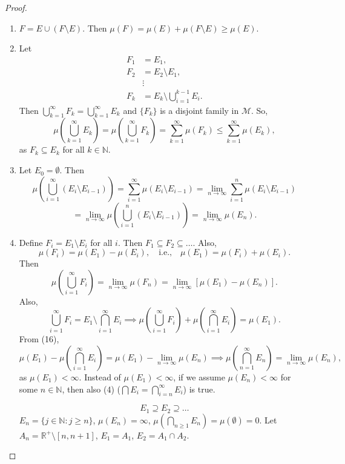 \documentclass{functionspaces}
\begin{document}
\begin{proof}
\begin{enumerate}[label=(\arabic*)]
    \item \( F = E \cup (F \setminus E) \). Then \( \mu(F) = \mu(E) + \mu(F \setminus E) \geq \mu(E) \).
    
    \item Let
    \begin{align*}
    F_1 &= E_1, \\
    F_2 &= E_2 \setminus E_1, \\
    &\vdots \\
    F_k &= E_k \setminus \bigcup_{i=1}^{k-1} E_i.
    \end{align*}
    Then \( \bigcup_{k=1}^{\infty} F_k = \bigcup_{k=1}^{\infty} E_k \) and \( \{F_k\} \) is a disjoint family in \( \mathcal{M} \). So,
    \[
    \mu\left( \bigcup_{k=1}^{\infty} E_k \right) = \mu\left( \bigcup_{k=1}^{\infty} F_k \right) = \sum_{k=1}^{\infty} \mu(F_k) \leq \sum_{k=1}^{\infty} \mu(E_k),
    \]
    as \( F_k \subseteq E_k \) for all \( k \in \mathbb{N} \).
    
    \item Let \( E_0 = \emptyset \). Then
    \[
    \mu\left( \bigcup_{i=1}^{\infty} (E_i \setminus E_{i-1}) \right) = \sum_{i=1}^{\infty} \mu(E_i \setminus E_{i-1}) = \lim_{n \to \infty} \sum_{i=1}^{n} \mu(E_i \setminus E_{i-1}) 
    \]
    \[
    = \lim_{n \to \infty} \mu\left( \bigcup_{i=1}^{n} (E_i \setminus E_{i-1}) \right) = \lim_{n \to \infty} \mu(E_n).
    \]
    
    \item Define \( F_i = E_1 \setminus E_i \) for all \( i \). Then \( F_1 \subseteq F_2 \subseteq \ldots \). Also,
    \[
    \mu(F_i) = \mu(E_1) - \mu(E_i), \quad \text{i.e.,} \quad \mu(E_1) = \mu(F_i) + \mu(E_i).
    \]
    Then
    \[
    \mu\left( \bigcup_{i=1}^{\infty} F_i \right) = \lim_{n \to \infty} \mu(F_n) = \lim_{n \to \infty} [\mu(E_1) - \mu(E_n)]. \tag{16}
    \]
    Also,
    \[
    \bigcup_{i=1}^{\infty} F_i = E_1 \setminus \bigcap_{i=1}^{\infty} E_i \implies \mu\left( \bigcup_{i=1}^{\infty} F_i \right) + \mu\left( \bigcap_{i=1}^{\infty} E_i \right) = \mu(E_1).
    \]
    From (16),
    \[
    \mu(E_1) - \mu\left( \bigcap_{i=1}^{\infty} E_i \right) = \mu(E_1) - \lim_{n \to \infty} \mu(E_n) \implies \mu\left( \bigcap_{n=1}^{\infty} E_n \right) = \lim_{n \to \infty} \mu(E_n),
    \]
    as \( \mu(E_1) < \infty \). Instead of \( \mu(E_1) < \infty \), if we assume \( \mu(E_n) < \infty \) for some \( n \in \mathbb{N} \), then also (4) (\( \bigcap E_i = \bigcap_{i=n}^{\infty} E_i \)) is true.
    
    \[
    E_1 \supseteq E_2 \supseteq \ldots
    \]
    \( E_n = \{j \in \mathbb{N} : j \geq n\} \), \( \mu(E_n) = \infty \), \( \mu\left( \bigcap_{n \geq 1} E_n \right) = \mu(\emptyset) = 0 \). Let \( A_n = \mathbb{R}^+ \setminus [n, n+1] \), \( E_1 = A_1 \), \( E_2 = A_1 \cap A_2 \).
\end{enumerate}
\end{proof}
\end{document}

